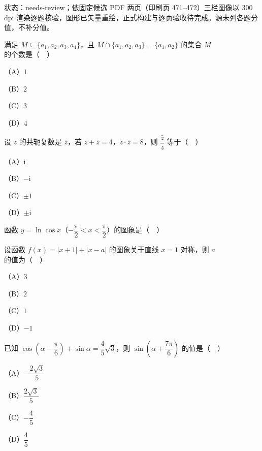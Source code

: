 

状态：needs-review；依固定候选 PDF 两页（印刷页 471–472）三栏图像以 300 dpi 渲染逐题核验，图形已矢量重绘，正式构建与逐页验收待完成。源未列各题分值，不补分值。


\begin{question}
满足 $M\subseteq\{a_1,a_2,a_3,a_4\}$，且 $M\cap\{a_1,a_2,a_3\}=\{a_1,a_2\}$ 的集合 $M$ 的个数是（　）

（A）$1$

（B）$2$

（C）$3$

（D）$4$

\end{question}
\begin{question}
设 $z$ 的共轭复数是 $\bar z$，若 $z+\bar z=4$，$z\cdot\bar z=8$，则 $\dfrac{\bar z}{z}$ 等于（　）

（A）$\mathrm i$

（B）$-\mathrm i$

（C）$\pm1$

（D）$\pm\mathrm i$

\Needspace{0.4\textheight}
\end{question}
\begingroup
\renewenvironment{question}{\Needspace{0.42\textheight}}{}
\begin{question}
函数 $y=\ln\cos x$（$-\dfrac{\pi}{2}<x<\dfrac{\pi}{2}$）的图象是（　）
\nopagebreak[4]
\begin{center}\end{center}
\nopagebreak[4]
\end{question}
\endgroup
\begin{question}
设函数 $f(x)=|x+1|+|x-a|$ 的图象关于直线 $x=1$ 对称，则 $a$ 的值为（　）

（A）$3$

（B）$2$

（C）$1$

（D）$-1$

\end{question}
\begin{question}
已知 $\cos\left(\alpha-\dfrac{\pi}{6}\right)+\sin\alpha=\dfrac45\sqrt3$，则 $\sin\left(\alpha+\dfrac{7\pi}{6}\right)$ 的值是（　）

（A）$-\dfrac{2\sqrt3}5$

（B）$\dfrac{2\sqrt3}5$

（C）$-\dfrac45$

（D）$\dfrac45$

\Needspace{0.4\textheight}
\end{question}
